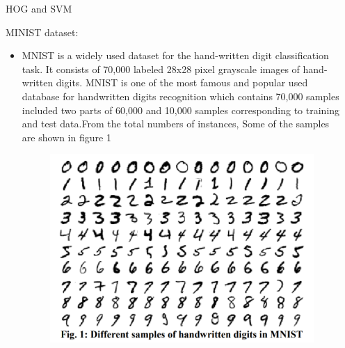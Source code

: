 \documentclass[8pt,final,hyperref={pdfpagelabels=false}]{beamer}
\theoremstyle{plain}
\begin{document}
\begin{frame}
\begin{columns}[t]
\begin{column}{.23\textwidth}
\begin{block}{HOG and SVM}
\begin{itemize}
        \end{itemize}
    \end{block}
    
    \begin{block}{MINIST dataset:}
        \begin{itemize}
            \item MNIST is a widely used dataset for the hand-written digit classification task. It consists of 70,000 labeled 28x28 pixel grayscale images of hand-written digits. MNIST is one of the most famous and popular used database for handwritten digits recognition which contains 70,000 samples included two parts of 60,000 and 10,000 samples corresponding to training and test data.From the total numbers of instances, Some of the samples are shown in figure 1
            \vspace{\baselineskip} 
             
           \begin{figure}
                \includegraphics[width=.8\linewidth]{figures/samples of handwritten digits.png}
            \end{figure}
        \end{itemize}
    \end{block}

\end{column} %
 
\begin{column}{.23\textwidth} %
    

\end{column}
\end{columns}
\end{frame}
\end{document}
